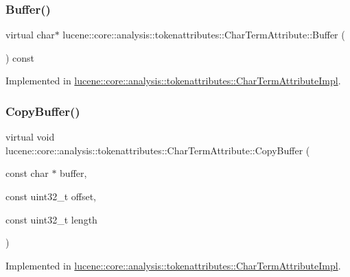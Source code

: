 \subsubsection{\texorpdfstring{Buffer()}{Buffer()}}
{\footnotesize\ttfamily virtual char$\ast$ lucene\+::core\+::analysis\+::tokenattributes\+::\+Char\+Term\+Attribute\+::\+Buffer (\begin{DoxyParamCaption}{ }\end{DoxyParamCaption}) const\hspace{0.3cm}{\ttfamily [pure virtual]}}



Implemented in \mbox{\hyperlink{classlucene_1_1core_1_1analysis_1_1tokenattributes_1_1CharTermAttributeImpl_af6663b6b4481ee51bd166f5c3123f9f8}{lucene\+::core\+::analysis\+::tokenattributes\+::\+Char\+Term\+Attribute\+Impl}}.

\mbox{\label{classlucene_1_1core_1_1analysis_1_1tokenattributes_1_1CharTermAttribute_ae03cbeb05b5b1e7c50f407e0025d41da}} 
\subsubsection{\texorpdfstring{Copy\+Buffer()}{CopyBuffer()}}
{\footnotesize\ttfamily virtual void lucene\+::core\+::analysis\+::tokenattributes\+::\+Char\+Term\+Attribute\+::\+Copy\+Buffer (\begin{DoxyParamCaption}\item[{const char $\ast$}]{buffer,  }\item[{const uint32\+\_\+t}]{offset,  }\item[{const uint32\+\_\+t}]{length }\end{DoxyParamCaption})\hspace{0.3cm}{\ttfamily [pure virtual]}}



Implemented in \mbox{\hyperlink{classlucene_1_1core_1_1analysis_1_1tokenattributes_1_1CharTermAttributeImpl_aacb3a44d6999a381dc9217616ba91317}{lucene\+::core\+::analysis\+::tokenattributes\+::\+Char\+Term\+Attribute\+Impl}}.

